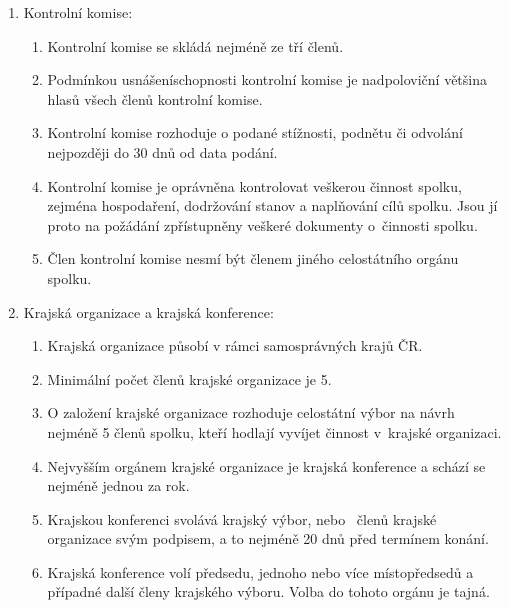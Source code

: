 \documentclass[a4paper]{article}
\begin{document}
\begin{enumerate}
\begin{enumerate}
        \end{enumerate}

    \item Kontrolní komise:
        \begin{enumerate}
        \item Kontrolní komise se skládá nejméně ze tří členů.

        \item Podmínkou usnášeníschopnosti kontrolní komise je nadpoloviční většina
            hlasů všech členů kontrolní komise.

        \item Kontrolní komise rozhoduje o podané stížnosti, podnětu či odvolání nejpozději do
            30 dnů od data podání.

        \item Kontrolní komise je oprávněna kontrolovat veškerou činnost
            spolku, zejména hospodaření, dodržování stanov a naplňování cílů
            spolku. Jsou jí proto na požádání zpřístupněny veškeré dokumenty
            o~činnosti spolku.
            
        \item Člen kontrolní komise nesmí být členem jiného celostátního orgánu spolku.
        \end{enumerate}

    \item Krajská organizace a krajská konference:
        \begin{enumerate}
        \item Krajská organizace působí v rámci samosprávných krajů ČR.

        \item Minimální počet členů krajské organizace je 5.

        \item O založení krajské organizace rozhoduje celostátní výbor
            na návrh nejméně 5 členů spolku, kteří hodlají vyvíjet činnost
            v~krajské organizaci.

        \item Nejvyšším orgánem krajské organizace je krajská konference a
            schází se nejméně jednou za rok.

        \item Krajskou konferenci svolává krajský výbor, nebo
            ~členů krajské organizace svým podpisem, a to
            nejméně 20 dnů před termínem konání.

        \item Krajská konference volí předsedu, jednoho nebo více
            místopředsedů a případné další členy krajského výboru.
            Volba do tohoto orgánu je tajná.


\end{enumerate}
\end{enumerate}
\end{document}
